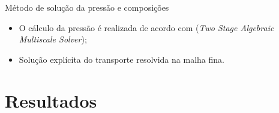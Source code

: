 \documentclass[professionalfont]{beamer}
\begin{document}
\begin{frame}{Método de solução da pressão e composições}

    \begin{itemize}
        \justifying
        \item<1-> O cálculo da pressão é realizada de acordo com  (\textit{Two Stage Algebraic Multiscale Solver});
        \item<2-> Solução explícita do transporte resolvida na malha fina. 
    \end{itemize}
    
\end{frame}

\renewcommand*{\theproblem}{%
    \arabic{problem}%
}

\section{Resultados}

\end{document}
